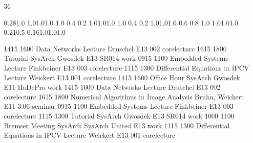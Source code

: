 \documentclass[a4paper,10pt]{report}
\begin{document}
\thispagestyle{empty}
\begin{landscape}

\setslotsize{2.8cm}{0.3cm}
 {36}
\settextframe{0.8mm}

 {0.28}{1.0} {1.0}{1.0}{1.0}
    {1.0} {0.4} {0.2} {1.0}{1.0}{1.0}
 {1.0} {0.4} {0.2} {1.0}{1.0}{1.0}
   {0.6} {0.8} {1.0} {1.0}{1.0}{1.0}
       {0.21}{0.5} {0.16}{1.0}{1.0}{1.0}

\begin{timetable}
   {1415} {1600} {Data Networks Lecture}                  {Druschel}        {E1{\tiny 3} 002}     {corelecture}
   {1615} {1800} {Tutorial SysArch}                       {Gwosdek}         {E1{\tiny 3} SR014}   {work}
   {0915} {1100} {Embedded Systems Lecture}               {Finkbeiner}      {E1{\tiny 3} 003}     {corelecture}
   {1115} {1300} {Differential Equations in IPCV Lecture} {Weickert}        {E1{\tiny 3} 001}     {corelecture}
   {1415} {1600} {Office Hour SysArch}                    {Gwosdek}         {E1{\tiny 1} HaDePra} {work}
   {1415} {1600} {Data Networks Lecture}                  {Druschel}        {E1{\tiny 3} 002}     {corelecture}
   {1615} {1800} {Numerical Algorithms in Image Analysis} {Bruhn, Weickert} {E1{\tiny 1} 3.06}    {seminar}
   {0915} {1100} {Embedded Systems Lecture}               {Finkbeiner}      {E1{\tiny 3} 003}     {corelecture}
   {1115} {1300} {Tutorial SysArch}                       {Gwosdek}         {E1{\tiny 3} SR014}   {work}
   {1000} {1100} {Bremser Meeting SysArch}                {SysArch United}  {E1{\tiny 3}}         {work}
   {1115} {1300} {Differential Equations in IPCV Lecture} {Weickert}        {E1{\tiny 3} 001}     {corelecture}
\end{timetable}
\end{landscape}
\end{document}

